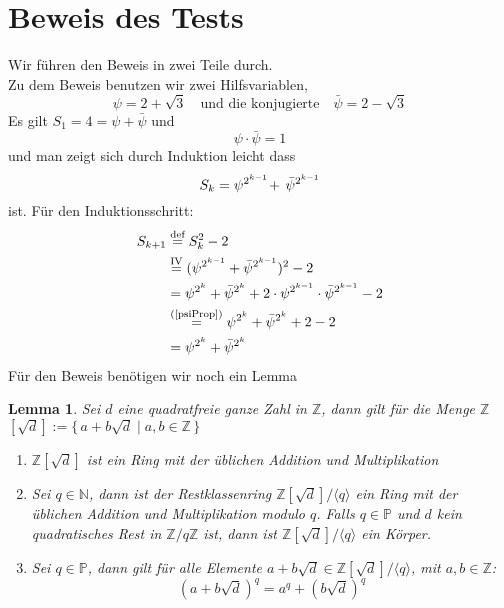 \documentclass{article}
\newtheorem{lemma}{Lemma}
\newcommand{\Prime}{\ensuremath{\mathbb{P}}}
\newcommand{\Nature}{\ensuremath{\mathbb{N}}}
\newcommand{\Integer}{\ensuremath{\mathbb{Z}}}
\newcommand{\ZAdjdModq}{\ensuremath{\Integer[\sqrt{d}]/\langle q \rangle}}
\newcommand{\Zmodq}{\ensuremath{\Integer/q\Integer}}
\begin{document}
\section{Beweis des Tests}
Wir f\"{u}hren den Beweis in zwei Teile durch.\\
Zu dem Beweis benutzen wir zwei Hilfsvariablen,
\[
	\psi = 2 + \sqrt{3}\quad \mbox{und die konjugierte}\quad \bar{\psi} = 2- \sqrt{3}
\]
Es gilt $S_1 = 4 = \psi + \bar{\psi}$ und 
\begin{equation}\label{psiProp}
	\psi \cdot \bar{\psi} = 1
\end{equation}
und man zeigt sich durch Induktion leicht dass 
\begin{equation}\label{Skpsi}
S_k \nobreak = \nobreak \psi^{2^{k-1}} \!+ \, \bar{\psi}^{2^{k-1}}
\end{equation} ist. F\"{u}r den Induktionsschritt:
\begin{align*}
	S_{k+1} &\overset{\text{def}}{=} S_{k}^2 - 2\\
			&\overset{\text{IV}}{=} (\psi^{2^{k-1}} + \bar{\psi}^{2^{k-1}})^2 - 2\\
			&= \psi^{2^{k}} + \bar{\psi}^{2^{k}} + 2\cdot \psi^{2^{k-1}} \cdot \bar{\psi}^{2^{k-1}} - 2\\
			&\overset{\text{(\ref{psiProp})}}{=} \psi^{2^{k}} + \bar{\psi}^{2^{k}} + 2 - 2\\
			&= \psi^{2^{k}} + \bar{\psi}^{2^{k}}
\end{align*}
F\"{u}r den Beweis ben\"{o}tigen wir noch ein Lemma
\begin{lemma}\label{restRing}
	Sei $d$ eine quadratfreie ganze Zahl in \Integer, dann gilt 
	f\"{u}r die Menge \Integer$[\sqrt{d}]:=\{\, a + b\sqrt{d} \mid a,b\in \Integer \,\}$
	\begin{enumerate}
		\item \Integer$[\sqrt{d}]$ ist ein Ring mit der \"{u}blichen Addition und Multiplikation
		\item Sei $q \in \Nature$, dann ist der Restklassenring $\ZAdjdModq$ ein Ring mit der \"{u}blichen Addition und Multiplikation modulo $q$. Falls $q \in \Prime$  und $d$ kein quadratisches Rest in $\Zmodq$ ist, dann ist $\ZAdjdModq$ ein K\"{o}rper.
		\item Sei $q \in \Prime$, dann gilt f\"{u}r alle Elemente $a + b\sqrt{d} \in \ZAdjdModq$, mit $a,b\in \Integer$:
		\[
			(a + b\sqrt{d})^q  = a^q + (b\sqrt{d})^q
		\]
	\end{enumerate}
\end{lemma}
\end{document}
